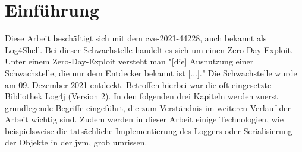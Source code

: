 
\section{Einführung}\label{sec:einfuhrung}
Diese Arbeit beschäftigt sich mit dem \gls{cve}-2021-44228, auch bekannt als Log4Shell. Bei dieser Schwachstelle handelt es sich
um einen Zero-Day-Exploit. Unter einem Zero-Day-Exploit versteht man "[die] Ausnutzung einer Schwachstelle, die nur dem Entdecker bekannt ist [...]."
Die Schwachstelle wurde am 09. Dezember 2021 entdeckt. Betroffen hierbei war die oft eingesetzte Bibliothek Log4j (Version 2). In den
folgenden drei Kapiteln werden zuerst grundlegende Begriffe eingeführt, die zum Verständnis im weiteren Verlauf der Arbeit wichtig sind.
Zudem werden in dieser Arbeit einige Technologien, wie beispielsweise die tatsächliche Implementierung des Loggers oder Serialisierung der Objekte in der
\gls{jvm}, grob umrissen.



